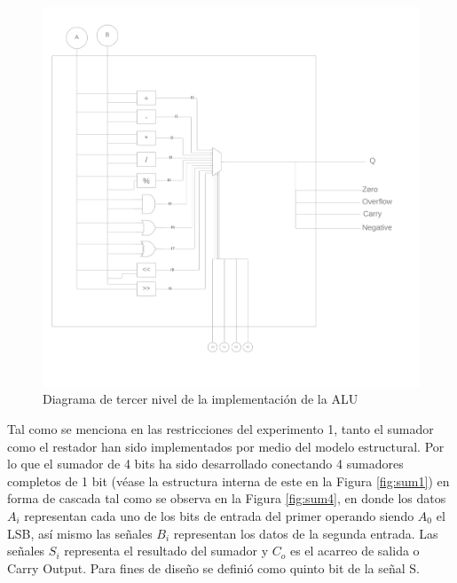 \documentclass[journal]{IEEEtran}
\begin{document}
	\begin{figure}[hbtp]
		\centering
		\includegraphics[scale = 0.07]{img/tercernivel.png}
		\caption{Diagrama de tercer nivel de la implementación de la ALU }
		\label{fig:d3}
	\end{figure}
	
	Tal como se menciona en las restricciones del experimento 1, tanto el sumador como el restador han sido implementados por medio del modelo estructural. Por lo que el sumador de 4 bits ha sido desarrollado conectando 4 sumadores completos de 1 bit (véase la estructura interna de este en la Figura \ref{fig:sum1}) en forma de cascada tal como se observa en la Figura \ref{fig:sum4}, en donde los datos $A_i$ representan cada uno de los bits de entrada del primer operando siendo $A_0$ el LSB, así mismo las señales $B_i$ representan los datos de la segunda entrada. Las señales $S_i$ representa el resultado del sumador y $C_o$ es el acarreo de salida o Carry Output. Para fines de diseño se definió como quinto bit de la señal S. 
	
\end{document}
